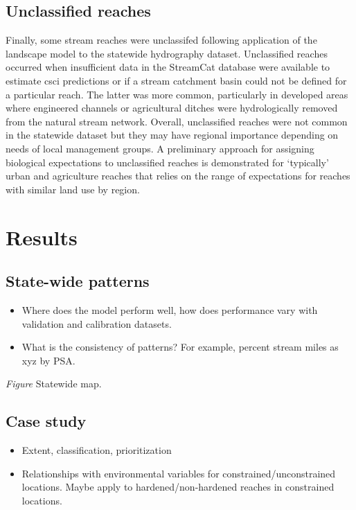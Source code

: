 \documentclass[]{article}
\begin{document}
\subsection{Unclassified reaches}\label{unclassified-reaches}

Finally, some stream reaches were unclassifed following application of
the landscape model to the statewide hydrography dataset. Unclassified
reaches occurred when insufficient data in the StreamCat database were
available to estimate \ac{csci} predictions or if a stream catchment
basin could not be defined for a particular reach. The latter was more
common, particularly in developed areas where engineered channels or
agricultural ditches were hydrologically removed from the natural stream
network. Overall, unclassified reaches were not common in the statewide
dataset but they may have regional importance depending on needs of
local management groups. A preliminary approach for assigning biological
expectations to unclassified reaches is demonstrated for `typically'
urban and agriculture reaches that relies on the range of expectations
for reaches with similar land use by region.

\section{Results}\label{results}

\subsection{State-wide patterns}\label{state-wide-patterns}

\begin{itemize}
\item
  Where does the model perform well, how does performance vary with
  validation and calibration datasets.
\item
  What is the consistency of patterns? For example, percent stream miles
  as xyz by PSA.
\end{itemize}

\emph{Figure} Statewide map.

\subsection{Case study}\label{case-study}

\begin{itemize}
\item
  Extent, classification, prioritization
\item
  Relationships with environmental variables for
  constrained/unconstrained locations. Maybe apply to
  hardened/non-hardened reaches in constrained locations.
\end{itemize}
\end{document}
